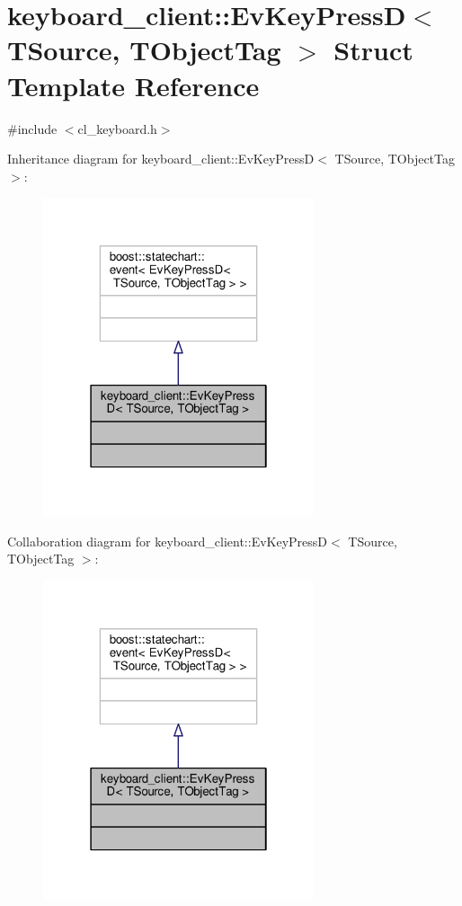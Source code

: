 \hypertarget{structkeyboard__client_1_1EvKeyPressD}{}\section{keyboard\+\_\+client\+:\+:Ev\+Key\+PressD$<$ T\+Source, T\+Object\+Tag $>$ Struct Template Reference}
\label{structkeyboard__client_1_1EvKeyPressD}


{\ttfamily \#include $<$cl\+\_\+keyboard.\+h$>$}



Inheritance diagram for keyboard\+\_\+client\+:\+:Ev\+Key\+PressD$<$ T\+Source, T\+Object\+Tag $>$\+:\nopagebreak
\begin{figure}[H]
\begin{center}
\leavevmode
\includegraphics[width=226pt]{structkeyboard__client_1_1EvKeyPressD__inherit__graph}
\end{center}
\end{figure}


Collaboration diagram for keyboard\+\_\+client\+:\+:Ev\+Key\+PressD$<$ T\+Source, T\+Object\+Tag $>$\+:\nopagebreak
\begin{figure}[H]
\begin{center}
\leavevmode
\includegraphics[width=226pt]{structkeyboard__client_1_1EvKeyPressD__coll__graph}
\end{center}
\end{figure}


